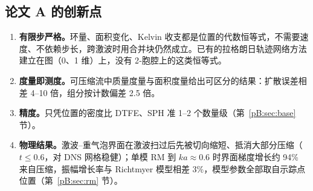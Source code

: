 \subsection{论文 A 的创新点}
\begin{enumerate}
\item \textbf{有限步严格。}环量、面积变化、Kelvin 收支都是位置的代数恒等式，不需要速度、不依赖步长，跨激波时用合并块仍然成立。已有的拉格朗日轨迹网络方法建立在图（0、1 维）上，没有 2‑胞腔上的这类恒等式。
\item \textbf{度量即测度。}可压缩流中质量度量与面积度量给出可区分的结果：扩散误差相差 4–10 倍，组分按计数偏差 2.5 倍。
\item \textbf{精度。}只凭位置的密度比 DTFE、SPH 准 1–2 个数量级（第~\ref{pB:sec:base} 节）。
\item \textbf{物理结果。}激波–重气泡界面在激波扫过后先被切向缩短、抵消大部分压缩（$t\le0.6$，对 DNS 网格稳健）；单模 RM 到 $ka\approx0.6$ 时界面梯度增长约 94\% 来自压缩，振幅增长率与 Richtmyer 模型相差 3\%，模型参数全部取自示踪点位置（第~\ref{pB:sec:rm} 节）。
\end{enumerate}
